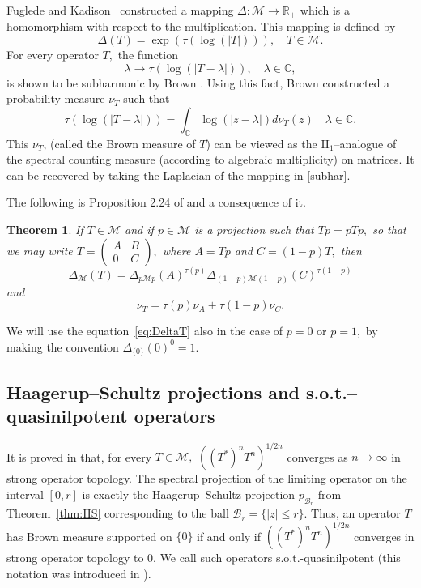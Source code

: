 \documentclass{amsart}
\theoremstyle{plain}
\newtheorem{thm}{Theorem}
\theoremstyle{remark}
\begin{document}
Fuglede and Kadison~\cite{FK} constructed a mapping $\Delta:\mathcal{M}\to\mathbb{R}_+$ which is a homomorphism with respect to the multiplication. This mapping is defined by
\begin{equation}\label{det}
\Delta(T)=\exp(\tau(\log(|T|))),\quad T\in\mathcal{M}.
\end{equation}
For every operator $T,$ the function
\begin{equation}\label{subhar}
\lambda\to\tau(\log(|T-\lambda|)),\quad\lambda\in\mathbb{C},
\end{equation}
is shown to be subharmonic by Brown \cite{Brown}. Using this fact, Brown constructed a probability measure $\nu_T$ such that
\begin{equation}\label{br def}
\tau(\log(|T-\lambda|))=\int_{\mathbb{C}}\log(|z-\lambda|)d\nu_T(z)\quad \lambda\in\mathbb{C}.
\end{equation}
This $\nu_T$, (called the Brown measure of $T$) can be viewed as the II$_1$--analogue of the spectral counting measure (according
to algebraic multiplicity) on matrices. It can be recovered by taking the Laplacian of the mapping in \eqref{subhar}.

The following is Proposition 2.24 of \cite{HS1} and a consequence of it.
\begin{thm}\label{thm:det nu matrix}
If $T\in\mathcal{M}$ and if $p\in\mathcal{M}$ is a projection such that $Tp=pTp,$ so that we may write
$T=\left(\begin{smallmatrix}
A&B\\
0&C
\end{smallmatrix}\right),$
where $A=Tp$ and $C=(1-p)T,$ then
\begin{equation}\label{eq:DeltaT}
\Delta_{\mathcal{M}}(T)=\Delta_{p\mathcal{M}p}(A)^{\tau(p)}\Delta_{(1-p)\mathcal{M}(1-p)}(C)^{\tau(1-p)}
\end{equation}
and
$$\nu_T=\tau(p)\nu_A+\tau(1-p)\nu_C.$$
\end{thm}
We will use the equation~\eqref{eq:DeltaT} also in the case of $p=0$ or $p=1,$ by making the convention $\Delta_{\{0\}}(0)^0=1.$

\subsection{Haagerup--Schultz projections and s.o.t.--quasinilpotent operators}
It is proved in \cite{HS2} that, for every $T\in\mathcal{M},$ $((T^*)^nT^n)^{1/2n}$ converges as $n\to\infty$ in strong operator topology. The spectral projection of the limiting operator on the interval $[0,r]$ is exactly the Haagerup--Schultz projection $p_{\mathcal{B}_r}$ from Theorem~\ref{thm:HS} corresponding to the ball $\mathcal{B}_r=\{|z|\leq r\}.$ Thus, an operator $T$ has Brown measure supported on $\{0\}$ if and only if $((T^*)^nT^n)^{1/2n}$ converges in strong operator topology to $0.$ We call such operators s.o.t.-quasinilpotent (this notation was introduced in \cite{DFS}).
\end{document}

